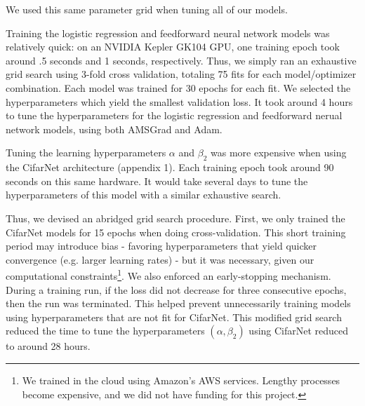 \documentclass[letterpaper, 10 pt, conference]{ieeeconf}  %
\begin{document}
We used this same parameter grid when tuning all of our models. 

Training the logistic regression and feedforward neural network models was relatively quick: on an NVIDIA Kepler GK104 GPU, one training epoch took around .5 seconds and 1 seconds, respectively. Thus, we simply ran an exhaustive grid search using 3-fold cross validation, totaling 75 fits for each model/optimizer combination. Each model was trained for 30 epochs for each fit. We selected the hyperparameters which yield the smallest validation loss. It took around 4 hours  to tune the hyperparameters for the logistic regression and feedforward nerual network models, using both AMSGrad and Adam. 

Tuning the learning hyperparameters $\alpha$ and $\beta_2$ was more expensive when using the CifarNet architecture (appendix 1). Each training epoch took around 90 seconds on this same hardware. It would take several days to tune the hyperparameters of this model with a similar exhaustive search.

Thus, we devised an abridged grid search procedure. First, we only trained the CifarNet models for 15 epochs when doing cross-validation. This short training period may introduce bias - favoring hyperparameters that yield quicker convergence (e.g. larger learning rates) - but it was necessary, given our computational constraints\footnote{We trained in the cloud using Amazon's AWS services. Lengthy processes become expensive, and we did not have funding for this project.}. We also enforced an early-stopping mechanism. During a training run, if the loss did not decrease for three consecutive epochs, then the run was terminated. This helped prevent unnecessarily training models using hyperparameters that are not fit for CifarNet. This modified grid search reduced the time to tune the hyperparameters $(\alpha, \beta_2)$ using CifarNet reduced to around 28 hours.
\end{document}

